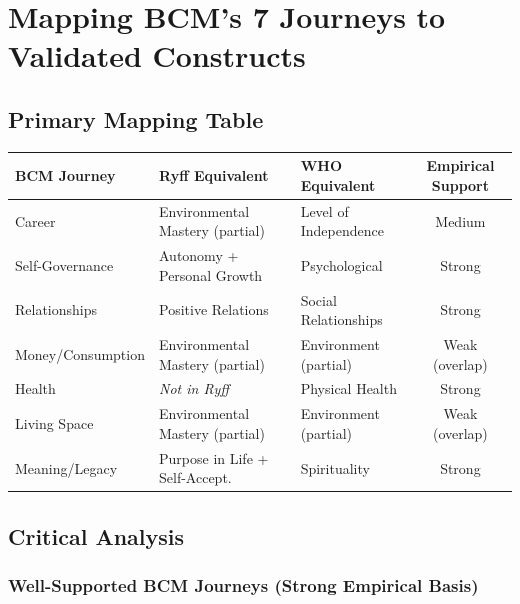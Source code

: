 
\section{Mapping BCM's 7 Journeys to Validated Constructs}
\label{sec:bj-mapping}

\subsection{Primary Mapping Table}

\begin{center}
\small
\begin{tabular}{@{}lllc@{}}
\toprule
\textbf{BCM Journey} & \textbf{Ryff Equivalent} & \textbf{WHO Equivalent} & \textbf{Empirical Support} \\
\midrule
Career & Environmental Mastery (partial) & Level of Independence & Medium \\
Self-Governance & Autonomy + Personal Growth & Psychological & Strong \\
Relationships & Positive Relations & Social Relationships & Strong \\
Money/Consumption & Environmental Mastery (partial) & Environment (partial) & Weak (overlap) \\
Health & \textit{Not in Ryff} & Physical Health & Strong \\
Living Space & Environmental Mastery (partial) & Environment (partial) & Weak (overlap) \\
Meaning/Legacy & Purpose in Life + Self-Accept. & Spirituality & Strong \\
\bottomrule
\end{tabular}
\end{center}

\subsection{Critical Analysis}

\subsubsection{Well-Supported BCM Journeys (Strong Empirical Basis)}

